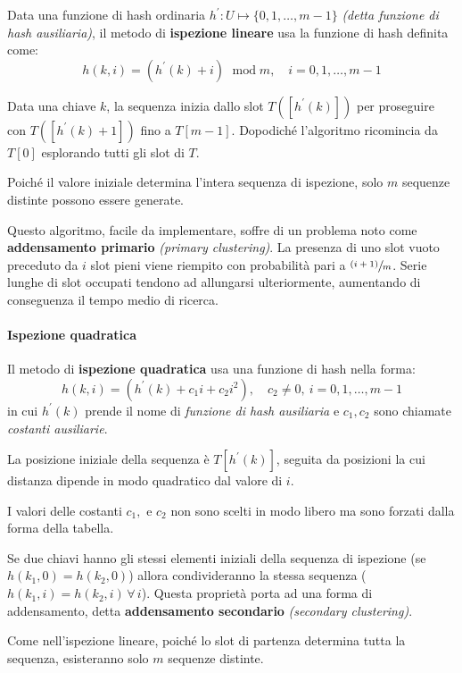 \documentclass[italian, 10pt]{article}
\DeclareMathOperator{\modop}{\ mod}
\begin{document}
Data una funzione di hash ordinaria \(h^\prime : U \mapsto \{0, 1, \ldots, m-1\}\) \textit{(detta funzione di hash ausiliaria)}, il metodo di \textbf{ispezione lineare} usa la funzione di hash definita come:
\[ h(k, i) = (h^\prime(k) + i) \modop m, \quad i = 0, 1, \ldots, m-1 \]

Data una chiave \(k\), la sequenza inizia dallo slot \(T\left([h^\prime (k)]\right)\) per proseguire con \(T\left([h^\prime (k) + 1]\right)\) fino a \(T[m-1]\).
Dopodiché l'algoritmo ricomincia da \(T[0]\) esplorando tutti gli slot di \(T\).

Poiché il valore iniziale determina l'intera sequenza di ispezione, solo \(m\) sequenze distinte possono essere generate.

\bigskip
Questo algoritmo, facile da implementare, soffre di un problema noto come \textbf{addensamento primario} \textit{(primary clustering)}.
La presenza di uno slot vuoto preceduto da \(i\) slot pieni viene riempito con probabilità pari a \(\sfrac{(i+1)}{m}\).
Serie lunghe di slot occupati tendono ad allungarsi ulteriormente, aumentando di conseguenza il tempo medio di ricerca.

\paragraph{Ispezione quadratica}

Il metodo di \textbf{ispezione quadratica} usa una funzione di hash nella forma:
\[ h(k, i) = \left(h^\prime(k) + c_1 i + c_2 i ^2\right), \quad c_2 \neq 0,\ i = 0, 1, \ldots, m-1 \]
in cui \(h^\prime( k)\) prende il nome di \textit{funzione di hash ausiliaria} e \(c_1, c_2\) sono chiamate \textit{costanti ausiliarie}.

La posizione iniziale della sequenza è \(T\left[h^\prime (k)\right]\), seguita da posizioni la cui distanza dipende in modo quadratico dal valore di \(i\).

I valori delle costanti \(c_1,\) e \(c_2\) non sono scelti in modo libero ma sono forzati dalla forma della tabella.

\bigskip
Se due chiavi hanno gli stessi elementi iniziali della sequenza di ispezione (se \(h(k_1, 0) = h(k_2, 0)\)) allora condivideranno la stessa sequenza (\(h(k_1, i) = h(k_2, i) \, \forall \, i\)).
Questa proprietà porta ad una forma di addensamento, detta \textbf{addensamento secondario} \textit{(secondary clustering)}.

Come nell'ispezione lineare, poiché lo slot di partenza determina tutta la sequenza, esisteranno solo \(m\) sequenze distinte.
\end{document}

